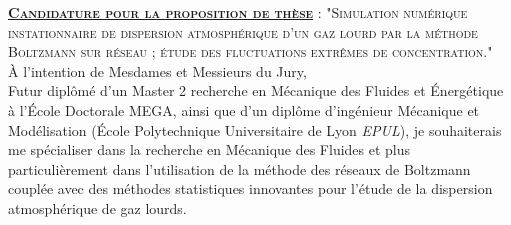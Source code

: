 \documentclass[french, roman, 11pt]{article}
\newcommand{\navy}{\color{navy}}
\begin{document}
\thispagestyle{fancy}

\noindent \textsc{\textbf{\navy \underline{Candidature pour la proposition de thèse}} : "Simulation numérique instationnaire de dispersion atmosphérique
d’un gaz lourd par la méthode Boltzmann sur réseau ; étude des fluctuations extrêmes de concentration."} \\[4mm]

\noindent À l'intention de Mesdames et Messieurs du Jury, \\[2mm]

\hspace{8 mm }Futur diplômé d'un Master 2 recherche en Mécanique des Fluides et Énergétique à l'École Doctorale \textsc{MEGA}, ainsi que d'un diplôme d'ingénieur Mécanique et Modélisation (École Polytechnique Universitaire de Lyon \textit{\textsc{EPUL}}), je souhaiterais me spécialiser dans la recherche en Mécanique des Fluides et plus particulièrement dans l'utilisation de la méthode des réseaux de Boltzmann couplée avec des méthodes statistiques innovantes pour l'étude de la dispersion atmosphérique de gaz lourds. \\
\end{document}

